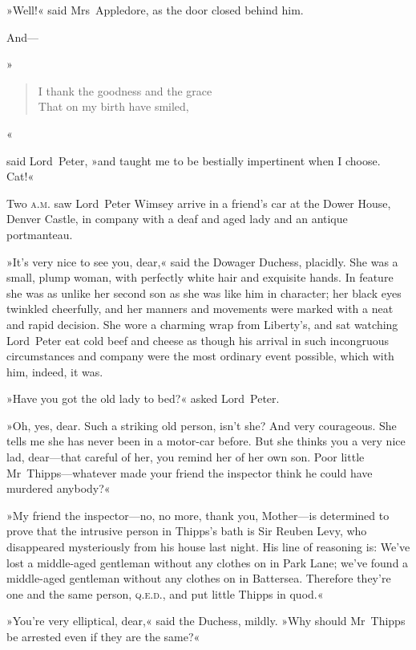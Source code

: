 »Well!« said Mrs~Appledore, as the door closed behind him.

And—

»\begin{verse}
I thank the goodness and the grace\\
That on my birth have smiled,\\
\end{verse}«

said Lord~Peter, »and taught me to be bestially impertinent when I choose. Cat!«

Two \textsc{a.m.} saw Lord~Peter Wimsey arrive in a friend's car at the Dower House, Denver Castle, in company with a deaf and aged lady and an antique portmanteau.

»It's very nice to see you, dear,« said the Dowager Duchess, placidly. She was a small, plump woman, with perfectly white hair and exquisite hands. In feature she was as unlike her second son as she was like him in character; her black eyes twinkled cheerfully, and her manners and movements were marked with a neat and rapid decision. She wore a charming wrap from Liberty's, and sat watching Lord~Peter eat cold beef and cheese as though his arrival in such incongruous circumstances and company were the most ordinary event possible, which with him, indeed, it was.

»Have you got the old lady to bed?« asked Lord~Peter.

»Oh, yes, dear. Such a striking old person, isn't she? And very courageous. She tells me she has never been in a motor-car before. But she thinks you a very nice lad, dear—that careful of her, you remind her of her own son. Poor little Mr~Thipps—whatever made your friend the inspector think he could have murdered anybody?«

»My friend the inspector—no, no more, thank you, Mother—is determined to prove that the intrusive person in Thipps's bath is Sir Reuben Levy, who disappeared mysteriously from his house last night. His line of reasoning is: We've lost a middle-aged gentleman without any clothes on in Park Lane; we've found a middle-aged gentleman without any clothes on in Battersea. Therefore they're one and the same person, \textsc{q.e.d.}, and put little Thipps in quod.«

»You're very elliptical, dear,« said the Duchess, mildly. »Why should Mr~Thipps be arrested even if they are the same?«


